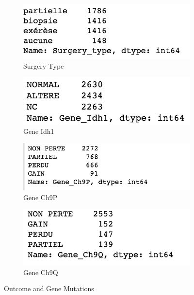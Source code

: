 \documentclass[a4paper]{article}
\begin{document}
\begin{figure}[H]
\centering
\begin{subfigure}{.2\textwidth}
  \centering
  \includegraphics[width=1.0\linewidth]{images/Surgery_type.png}
  \caption{Surgery Type}
  \label{fig:sub1}
\end{subfigure}%
\begin{subfigure}{.2\textwidth}
  \centering
  \includegraphics[width=1.0\linewidth]{images/Gene_Idh1.png}
  \caption{Gene Idh1}
  \label{fig:sub2}
\end{subfigure}%
\begin{subfigure}{.2\textwidth}
  \centering
  \includegraphics[width=1.0\linewidth]{images/Gene_Ch9P.png}
  \caption{Gene Ch9P}
  \label{fig:sub3}
\end{subfigure}
\begin{subfigure}{.2\textwidth}%
  \centering
  \includegraphics[width=1.0\linewidth]{images/Gene_Ch9Q.png}
  \caption{Gene Ch9Q}
  \label{fig:sub4}
\end{subfigure}
\caption{Outcome and Gene Mutations}
\label{fig:genes}
\end{figure}
\end{document}
